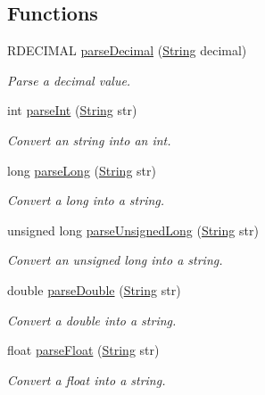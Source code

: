 \subsection*{Functions}
\begin{DoxyCompactItemize}
\item 
R\+D\+E\+C\+I\+M\+AL \mbox{\hyperlink{namespace_rad_j_a_v_afb127eaa0609cdc7d800f9239bd59e98}{parse\+Decimal}} (\mbox{\hyperlink{class_rad_j_a_v_1_1_string}{String}} decimal)
\begin{DoxyCompactList}\small\item\em Parse a decimal value. \end{DoxyCompactList}\item 
int \mbox{\hyperlink{namespace_rad_j_a_v_a49f8eb01edf646954f8695daccc62fd6}{parse\+Int}} (\mbox{\hyperlink{class_rad_j_a_v_1_1_string}{String}} str)
\begin{DoxyCompactList}\small\item\em Convert an string into an int. \end{DoxyCompactList}\item 
long \mbox{\hyperlink{namespace_rad_j_a_v_a3ff124a25d6c3f369fb0c6549b8cc715}{parse\+Long}} (\mbox{\hyperlink{class_rad_j_a_v_1_1_string}{String}} str)
\begin{DoxyCompactList}\small\item\em Convert a long into a string. \end{DoxyCompactList}\item 
unsigned long \mbox{\hyperlink{namespace_rad_j_a_v_ac8f5f34f742526d09fcc982780f97c43}{parse\+Unsigned\+Long}} (\mbox{\hyperlink{class_rad_j_a_v_1_1_string}{String}} str)
\begin{DoxyCompactList}\small\item\em Convert an unsigned long into a string. \end{DoxyCompactList}\item 
double \mbox{\hyperlink{namespace_rad_j_a_v_a6aeeb0a6113b36fc86478e43a2792935}{parse\+Double}} (\mbox{\hyperlink{class_rad_j_a_v_1_1_string}{String}} str)
\begin{DoxyCompactList}\small\item\em Convert a double into a string. \end{DoxyCompactList}\item 
float \mbox{\hyperlink{namespace_rad_j_a_v_a5ca1dcc1c7f181ae77b19c1b3c31a70a}{parse\+Float}} (\mbox{\hyperlink{class_rad_j_a_v_1_1_string}{String}} str)
\begin{DoxyCompactList}\small\item\em Convert a float into a string. \end{DoxyCompactList}\item 

\end{DoxyCompactItemize}
